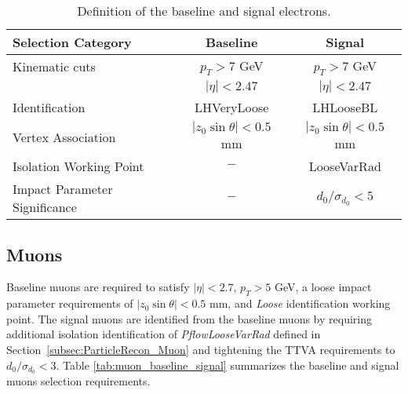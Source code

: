 \begin{table}[!htbp]
    \centering
        \caption{Definition of the baseline and signal electrons.\label{tab:Electron_RecoSel}}
        \begin{tabular}{|| l || c | c ||}
        \hline
        Selection Category & \textbf{Baseline} & \textbf{Signal} \\
        \hline\hline
        Kinematic cuts & $p_{T} > 7$ GeV & $ p_{T} > 7$ GeV \\
                    & $|\eta| < 2.47$  &  $|\eta| < 2.47$\\
        \hline  
        Identification & LHVeryLoose & LHLooseBL \\
        \hline 
        Vertex Association & $|z_{0}\sin\theta| < 0.5$ mm & $|z_{0}\sin\theta|< 0.5$ mm\\
        \hline
        Isolation Working Point & $-$ & LooseVarRad\\
        \hline 
        Impact Parameter Significance & $-$ & $d_{0}/ \sigma_{d_{0}} < 5$ \\
        \hline
    \end{tabular}
\end{table}

\subsection{Muons}
\label{subsec:MuonRecon}
Baseline muons are required to satisfy $ |\eta| < 2.7 $, $p_{T} > 5$ GeV, a loose impact parameter requirements of $|z_{0}\sin\theta| < 0.5 $ mm, and \textit{Loose} identification working point. The signal muons are identified from the baseline muons by requiring additional isolation identification of \textit{PflowLooseVarRad} defined in Section~\ref{subsec:ParticleRecon_Muon} and tightening the TTVA requirements to $d_{0}/\sigma_{d_{0}} < 3$. Table \ref{tab:muon_baseline_signal} summarizes the baseline and signal muons selection requirements.

